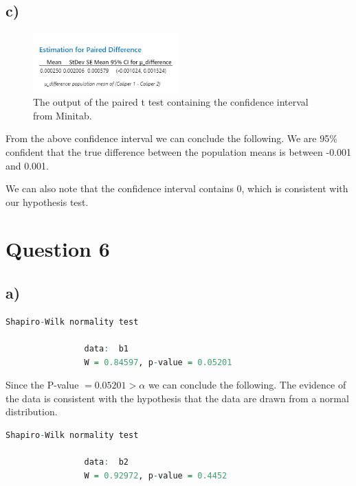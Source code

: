 \documentclass{article}
\begin{document}
\subsection*{c)}

\begin{figure}[h]
  \centering
  \includegraphics[width=0.5\textwidth]{./images/5_a.png}
  \caption{The output of the paired t test containing the confidence interval from Minitab.}
  \label{fig:5_a}
\end{figure}
From the above confidence interval we can conclude the following.
We are 95\% confident that the true difference between the population means is between -0.001 and 0.001.

We can also note that the confidence interval contains 0, which is consistent with our hypothesis test.

\clearpage
\section*{Question 6}

\subsection*{a)}
\begin{lstlisting}[language=R, caption=R output of Shapiro-Wilk test on Birth Order: 1, basicstyle=\small]
                Shapiro-Wilk normality test

                data:  b1
                W = 0.84597, p-value = 0.05201
\end{lstlisting}

Since the P-value $= 0.05201 > \alpha$ we can conclude the following.
    The evidence of the data is consistent with the hypothesis that the data are drawn from a normal distribution.



\begin{lstlisting}[language=R, caption=R output of Shapiro-Wilk test on Birth Order: 1, basicstyle=\small]
                Shapiro-Wilk normality test

                data:  b2
                W = 0.92972, p-value = 0.4452
\end{lstlisting}
\end{document}
